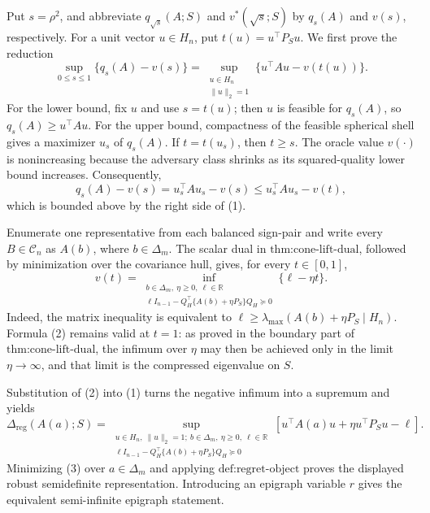 Put \(s=\rho^2\), and abbreviate \(q_{\sqrt{s}}(A;S)\) and \(v^*(\sqrt{s};S)\) by \(q_s(A)\) and \(v(s)\), respectively.  For a unit vector \(u\in H_n\), put \(t(u)=u^\top P_Su\).  We first prove the reduction
\[
 \sup_{0\leq s\leq1}\{q_s(A)-v(s)\}
 =\sup_{\substack{u\in H_n\\ \|u\|_2=1}}
   \{u^\top Au-v(t(u))\}.
 \tag{1}
\]
For the lower bound, fix \(u\) and use \(s=t(u)\); then \(u\) is feasible for \(q_s(A)\), so \(q_s(A)\geq u^\top Au\).  For the upper bound, compactness of the feasible spherical shell gives a maximizer \(u_s\) of \(q_s(A)\).  If \(t=t(u_s)\), then \(t\geq s\).  The oracle value \(v(\cdot)\) is nonincreasing because the adversary class shrinks as its squared-quality lower bound increases.  Consequently,
\[
 q_s(A)-v(s)=u_s^\top Au_s-v(s)
 \leq u_s^\top Au_s-v(t),
\]
which is bounded above by the right side of (1).

Enumerate one representative from each balanced sign-pair and write every \(B\in\mathcal C_n\) as \(A(b)\), where \(b\in\Delta_m\).  The scalar dual in \(\text{thm:cone-lift-dual}\), followed by minimization over the covariance hull, gives, for every \(t\in[0,1]\),
\[
 v(t)=
 \inf_{\substack{b\in\Delta_m,\ \eta\geq0,\ \ell\in\mathbb R\\
 \ell I_{n-1}-Q_H^\top\{A(b)+\eta P_S\}Q_H\succeq0}}
 \{\ell-\eta t\}.
 \tag{2}
\]
Indeed, the matrix inequality is equivalent to
\(\ell\geq\lambda_{\max}(A(b)+\eta P_S\mid H_n)\).  Formula (2) remains valid at \(t=1\): as proved in the boundary part of \(\text{thm:cone-lift-dual}\), the infimum over \(\eta\) may then be achieved only in the limit \(\eta\to\infty\), and that limit is the compressed eigenvalue on \(S\).

Substitution of (2) into (1) turns the negative infimum into a supremum and yields
\[
 \Delta_{\mathrm{reg}}(A(a);S)
 =\sup_{\substack{u\in H_n,\ \|u\|_2=1;\ b\in\Delta_m,\ \eta\geq0,\ \ell\in\mathbb R\\
 \ell I_{n-1}-Q_H^\top\{A(b)+\eta P_S\}Q_H\succeq0}}
 \left[u^\top A(a)u+\eta u^\top P_Su-\ell\right].
 \tag{3}
\]
Minimizing (3) over \(a\in\Delta_m\) and applying \(\text{def:regret-object}\) proves the displayed robust semidefinite representation.  Introducing an epigraph variable \(r\) gives the equivalent semi-infinite epigraph statement.

